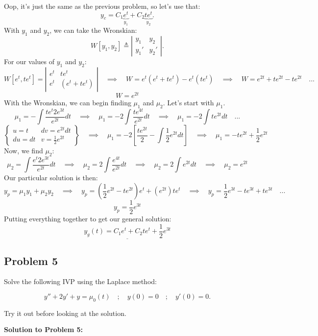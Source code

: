 \documentclass[a4paper,12pt]{article}
\begin{document}
Oop, it's just the same as the previous problem, so let's use that:
$$ y_c = C_1\underbrace{e^{t}}_{y_1} + C_2\underbrace{te^{t}}_{y_2}. $$
With $y_1$ and $y_2$, we can take the Wronskian:
$$ W[y_1, y_2] \triangleq \left|\begin{matrix}
	 y_1 & y_2 \\
	 y_1' & y_2'
\end{matrix}\right|. $$
For our values of $y_1$ and $y_2$:
$$ W[e^t, te^t] = \left|\begin{matrix}
	e^t & te^t \\
	e^t & (e^t + te^t)
\end{matrix} \right| \quad\implies\quad W = e^t(e^t + te^t) - e^t(te^t) \quad\implies\quad W = e^{2t} + te^{2t} - te^{2t} \quad ... $$
$$ \boxed{W = e^{2t}} $$
With the Wronskian, we can begin finding $\mu_1$ and $\mu_2$. Let's start with $\mu_1$.
$$ \mu_1 = -\int \frac{te^t2e^{3t}}{e^{2t}}dt \quad\implies\quad \mu_1 = -2\int\frac{te^{4t}}{e^{2t}}dt \quad\implies\quad \mu_1 = -2 \int te^{2t}dt\quad ...
$$
$$ \left\{\begin{matrix}
	u = t & dv = e^{2t}dt\\
	du = dt & v = \frac{1}{2}e^{2t}
\end{matrix}\right\} \quad\implies\quad \mu_1 = -2\left[\frac{te^{2t}}{2} - \int \frac{1}{2}e^{2t}dt\right] \quad\implies\quad \boxed{\mu_1 = -te^{2t} +\frac{1}{2}e^{2t}} $$
Now, we find $\mu_2$:
$$ \mu_2 = \int \frac{e^{t}2e^{3t}}{e^{2t}}dt \quad\implies\quad \mu_2 = 2\int \frac{e^{4t}}{e^{2t}}dt \quad\implies\quad \mu_2 = 2\int e^{2t}dt \quad\implies\quad \boxed{\mu_2 = e^{2t}} $$
Our particular solution is then:
$$ y_p = \mu_1y_1 + \mu_2y_2 \quad\implies\quad y_p = \left(\frac{1}{2}e^{2t} - te^{2t}\right)e^t + (e^{2t})te^{t} \quad\implies\quad y_p = \frac{1}{2}e^{3t} -te^{3t} + te^{3t} \quad... $$
$$ \boxed{y_p = \frac{1}{2}e^{3t}}  $$
Putting everything together to get our general solution:
$$ \underline{\boxed{y_g(t) = C_1e^t + C_2te^t + \frac{1}{2}e^{3t}}} $$

\pagebreak

\subsection*{Problem 5} Solve the following IVP using the Laplace method:

$$ y''+2y'+ y=\mu_0(t) \quad;\quad y(0)=0\quad;\quad y'(0)=0. $$

Try it out before looking at the solution.
\pagebreak

\textbf{Solution to Problem 5:}
\end{document}
